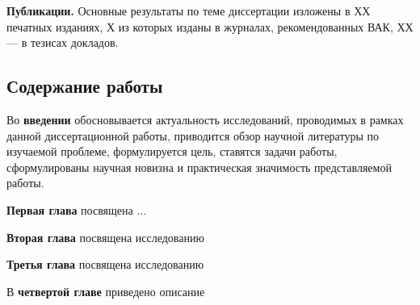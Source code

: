 

\textbf{Публикации.} Основные результаты по теме диссертации изложены в ХХ печатных изданиях, Х из которых изданы в журналах, рекомендованных ВАК, ХХ --- в тезисах докладов.


\subsection*{\Large Содержание работы}
Во \textbf{введении} обосновывается актуальность исследований, проводимых в рамках данной диссертационной работы, приводится обзор научной литературы по изучаемой проблеме, формулируется цель, ставятся задачи работы, сформулированы научная новизна и практическая значимость представляемой работы.

\textbf{Первая глава} посвящена ...



\textbf{Вторая глава} посвящена исследованию 

\textbf{Третья глава} посвящена исследованию 

В \textbf{четвертой главе} приведено описание 


